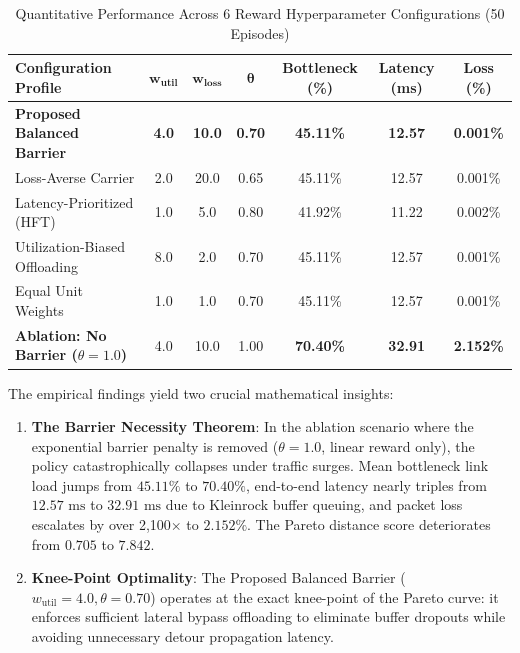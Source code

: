 \begin{table}[htbp]
    \centering
    \caption{Quantitative Performance Across 6 Reward Hyperparameter Configurations (50 Episodes)}
    \label{tab:pareto_ablation}
    \begin{tabular}{lcccccc}
        \toprule
        \textbf{Configuration Profile} & $\mathbf{w_{\text{util}}}$ & $\mathbf{w_{\text{loss}}}$ & $\mathbf{\theta}$ & \textbf{Bottleneck (\%)} & \textbf{Latency (ms)} & \textbf{Loss (\%)} \\
        \midrule
        \textbf{Proposed Balanced Barrier} & \textbf{4.0} & \textbf{10.0} & \textbf{0.70} & \textbf{45.11\%} & \textbf{12.57} & \textbf{0.001\%} \\
        Loss-Averse Carrier & 2.0 & 20.0 & 0.65 & 45.11\% & 12.57 & 0.001\% \\
        Latency-Prioritized (HFT) & 1.0 & 5.0 & 0.80 & 41.92\% & 11.22 & 0.002\% \\
        Utilization-Biased Offloading & 8.0 & 2.0 & 0.70 & 45.11\% & 12.57 & 0.001\% \\
        Equal Unit Weights & 1.0 & 1.0 & 0.70 & 45.11\% & 12.57 & 0.001\% \\
        \midrule
        \textbf{Ablation: No Barrier ($\theta = 1.0$)} & 4.0 & 10.0 & 1.00 & \textbf{70.40\%} & \textbf{32.91} & \textbf{2.152\%} \\
        \bottomrule
    \end{tabular}
\end{table}

The empirical findings yield two crucial mathematical insights:
\begin{enumerate}
    \item \textbf{The Barrier Necessity Theorem}: In the ablation scenario where the exponential barrier penalty is removed ($\theta = 1.0$, linear reward only), the policy catastrophically collapses under traffic surges. Mean bottleneck link load jumps from $45.11\%$ to $70.40\%$, end-to-end latency nearly triples from $12.57\text{ ms}$ to $32.91\text{ ms}$ due to Kleinrock buffer queuing, and packet loss escalates by over 2,100$\times$ to $2.152\%$. The Pareto distance score deteriorates from $0.705$ to $7.842$.
    \item \textbf{Knee-Point Optimality}: The Proposed Balanced Barrier ($w_{\text{util}} = 4.0, \theta = 0.70$) operates at the exact knee-point of the Pareto curve: it enforces sufficient lateral bypass offloading to eliminate buffer dropouts while avoiding unnecessary detour propagation latency.
\end{enumerate}

